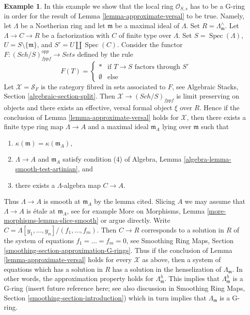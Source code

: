 \documentclass{stacks-project}
\theoremstyle{plain}
\theoremstyle{definition}
\newtheorem{example}[subsection]{Example}
\theoremstyle{remark}
\numberwithin{equation}{subsection}
\def\Spec{\mathop{\mathrm{Spec}}}
\def\Sch{\mathit{Sch}}
\begin{document}
\begin{example}
\label{example-approximate-versal-implies}
In this example we show that the local ring $\mathcal{O}_{S, s}$ has to be
a G-ring in order for the result of Lemma \ref{lemma-approximate-versal} to
be true. Namely, let $\Lambda$ be a Noetherian ring and let $\mathfrak m$
be a maximal ideal of $\Lambda$. Set $R = \Lambda_\mathfrak m^\wedge$. Let
$\Lambda \to C \to R$ be a factorization with $C$ of finite type over
$\Lambda$. Set $S = \Spec(\Lambda)$, $U = S \setminus \{\mathfrak m\}$, and
$S' = U \amalg \Spec(C)$. Consider the functor
$F : (\Sch/S)_{fppf}^{opp} \to \textit{Sets}$ defined by the rule
$$
F(T) = 
\left\{
\begin{matrix}
* & \text{if }T \to S\text{ factors through }S' \\
\emptyset & \text{else}
\end{matrix}
\right.
$$
Let $\mathcal{X} = \mathcal{S}_F$ is the category fibred in sets associated
to $F$, see Algebraic Stacks, Section \ref{algebraic-section-split}.
Then $\mathcal{X} \to (\Sch/S)_{fppf}$ is limit preserving on objects and
there exists an effective, versal formal object $\xi$ over $R$.
Hence if the conclusion of Lemma \ref{lemma-approximate-versal} holds
for $\mathcal{X}$, then there exists a finite type ring map $\Lambda \to A$
and a maximal ideal $\mathfrak m_A$ lying over $\mathfrak m$ such that
\begin{enumerate}
\item $\kappa(\mathfrak m) = \kappa(\mathfrak m_A)$,
\item $\Lambda \to A$ and $\mathfrak m_A$ satisfy condition (4) of
Algebra, Lemma \ref{algebra-lemma-smooth-test-artinian}, and
\item there exists a $\Lambda$-algebra map $C \to A$.
\end{enumerate}
Thus $\Lambda \to A$ is smooth at $\mathfrak m_A$ by the lemma cited.
Slicing $A$ we may assume that $\Lambda \to A$ is \'etale at
$\mathfrak m_A$, see for example
More on Morphisms, Lemma \ref{more-morphisms-lemma-slice-smooth}
or argue directly. Write $C = \Lambda[y_1, \ldots, y_n]/(f_1, \ldots, f_m)$.
Then $C \to R$ corresponds to a solution in $R$ of the system of equations
$f_1 = \ldots = f_m = 0$, see Smoothing Ring Maps, Section
\ref{smoothing-section-approximation-G-rings}.
Thus if the conclusion of
Lemma \ref{lemma-approximate-versal} holds for every $\mathcal{X}$ as
above, then a system of equations which has a solution in $R$ has a
solution in the henselization of $\Lambda_{\mathfrak m}$.
In other words, the approximation property holds for
$\Lambda_{\mathfrak m}^h$. This implies that $\Lambda_{\mathfrak m}^h$
is a G-ring (insert future reference here; see also discussion in
Smoothing Ring Maps, Section \ref{smoothing-section-introduction})
which in turn implies that $\Lambda_{\mathfrak m}$ is a G-ring.
\end{example}
\end{document}
